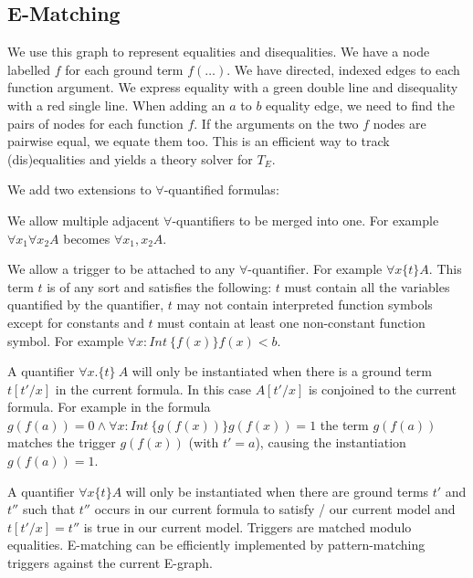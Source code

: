 \subsection{E-Matching}
\begin{mytitle}[E-graph] We use this graph to represent equalities and disequalities. We have a node labelled $f$ for each ground term $f(\ldots)$. We have directed, indexed edges to each function argument. We express equality with a green double line and disequality with a red single line. When adding an $a$ to $b$ equality edge, we need to find the pairs of nodes for each function $f$. If the arguments on the two $f$ nodes are pairwise equal, we equate them too. This is an efficient way to track (dis)equalities and yields a theory solver for $T_E$.
\end{mytitle}

\begin{mytitle} We add two extensions to $\forall$-quantified formulas:
    \begin{mysubtitle} We allow multiple adjacent $\forall$-quantifiers to be merged into one. For example $\forall x_1 \forall x_2 A$ becomes $\forall x_1, x_2 A$.
    \end{mysubtitle}
    \begin{mysubtitle}[Triggers] We allow a trigger to be attached to any $\forall$-quantifier. For example $\forall x \{t\} A$. This term $t$ is of any sort and satisfies the following: $t$ must contain all the variables quantified by the quantifier, $t$ may not contain interpreted function symbols except for constants and $t$ must contain at least one non-constant function symbol. For example $\forall x: Int\ \{f(x)\} f(x) < b$.
    \end{mysubtitle}
\end{mytitle}
\begin{mytitle} A quantifier $\forall x. \{t\}\ A$ will only be instantiated when there is a ground term $t[t'/x]$ in the current formula. In this case $A[t'/x]$ is conjoined to the current formula. For example in the formula $g(f(a))=0 \land \forall x: Int\ \{g(f(x))\} g(f(x)) = 1$ the term $g(f(a))$ matches the trigger $g(f(x))$ (with $t'=a$), causing the instantiation $g(f(a))=1$.
\end{mytitle}
\begin{mytitle}[E-matching] A quantifier $\forall x\{t\} A$ will only be instantiated when there are ground terms $t'$ and $t''$ such that $t''$ occurs in our current formula to satisfy / our current model and $t[t'/x] = t''$ is true in our current model. Triggers are matched modulo equalities. E-matching can be efficiently implemented by pattern-matching triggers against the current E-graph.
\end{mytitle}
